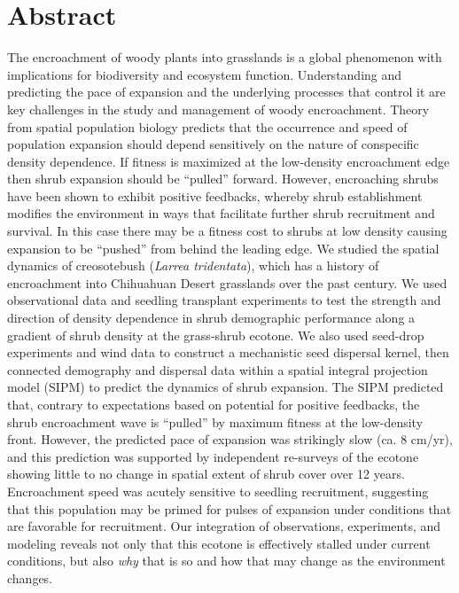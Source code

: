 \documentclass[11pt]{article}\usepackage[]{graphicx}\usepackage[usenames,dvipsnames]{xcolor}
\begin{document}
\section*{Abstract}
The encroachment of woody plants into grasslands is a global phenomenon with implications for biodiversity and ecosystem function. 
Understanding and predicting the pace of expansion and the underlying processes that control it are key challenges in the study and management of woody encroachment.
Theory from spatial population biology predicts that the occurrence and speed of population expansion should depend sensitively on the nature of conspecific density dependence.
If fitness is maximized at the low-density encroachment edge then shrub expansion should be ``pulled'' forward.
However, encroaching shrubs have been shown to exhibit positive feedbacks, whereby shrub establishment modifies the environment in ways that facilitate further shrub recruitment and survival. 
In this case there may be a fitness cost to shrubs at low density causing expansion to be ``pushed'' from behind the leading edge.
We studied the spatial dynamics of creosotebush (\textit{Larrea tridentata}), which has a history of encroachment into Chihuahuan Desert grasslands over the past century.
We used observational data and seedling transplant experiments to test the strength and direction of density dependence in shrub demographic performance along a gradient of shrub density at the grass-shrub ecotone. 
We also used seed-drop experiments and wind data to construct a mechanistic seed dispersal kernel, then connected demography and dispersal data within a spatial integral projection model (SIPM) to predict the dynamics of shrub expansion.
The SIPM predicted that, contrary to expectations based on potential for positive feedbacks, the shrub encroachment wave is ``pulled'' by maximum fitness at the low-density front.
However, the predicted pace of expansion was strikingly slow (ca. 8 cm/yr), and this prediction was supported by independent re-surveys of the ecotone showing little to no change in spatial extent of shrub cover over 12 years. 
Encroachment speed was acutely sensitive to seedling recruitment, suggesting that this population may be primed for pulses of expansion under conditions that are favorable for recruitment.
Our integration of observations, experiments, and modeling reveals not only that this ecotone is effectively stalled under current conditions, but also \emph{why} that is so and how that may change as the environment changes. 

\end{document}
